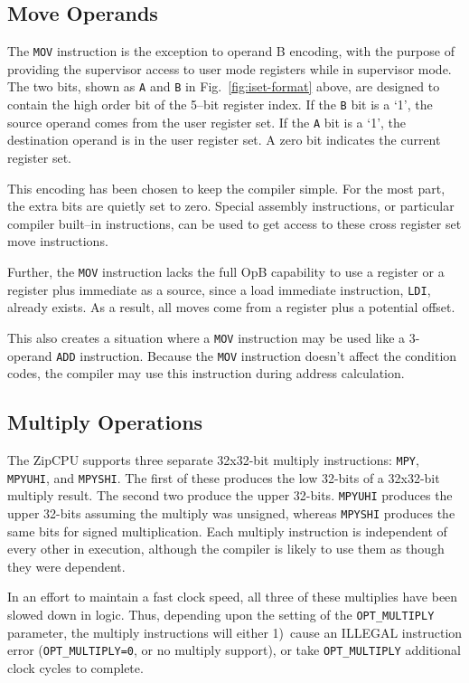 \documentclass{gqtekspec}
\begin{document}
\subsection{Move Operands}\label{sec:isa-mov}
The {\tt MOV} instruction is the exception to operand B encoding, with the
purpose of providing the supervisor access to user mode registers while in
supervisor mode.  The two bits, shown as {\tt A} and {\tt B} in
Fig.~\ref{fig:iset-format} above, are designed to contain the high order bit
of the 5--bit register index.  If the {\tt B} bit is a `1', the source operand
comes from the user register set.  If the {\tt A} bit is a `1', the
destination operand is in the user register set.  A zero bit indicates the
current register set.

This encoding has been chosen to keep the compiler simple.  For the most part,
the extra bits are quietly set to zero.  Special assembly instructions,
or particular compiler built--in instructions, can be used to get access to
these cross register set move instructions.

Further, the {\tt MOV} instruction lacks the full OpB capability to use a
register or a register plus immediate as a source, since a load immediate
instruction, {\tt LDI}, already exists.  As a result, all moves come from a
register plus a potential offset.

This also creates a situation where a {\tt MOV} instruction may be used
like a 3-operand {\tt ADD} instruction.  Because the {\tt MOV} instruction
doesn't affect the condition codes, the compiler may use this instruction
during address calculation.
\subsection{Multiply Operations}\label{sec:isa-mpy}
The ZipCPU supports three separate 32x32-bit multiply instructions: {\tt MPY},
{\tt MPYUHI}, and {\tt MPYSHI}.  The first of these produces the low 32-bits
of a 32x32-bit multiply result.  The second two produce the upper 32-bits.
{\tt MPYUHI} produces the upper 32-bits assuming the multiply was unsigned,
whereas {\tt MPYSHI} produces the same bits for signed multiplication.  Each
multiply instruction is independent of every other in execution, although
the compiler is likely to use them as though they were dependent.

In an effort to maintain a fast clock speed, all three of these multiplies
have been slowed down in logic.  Thus, depending upon the setting of
the {\tt OPT\_MULTIPLY} parameter, the multiply instructions
will either 1)~cause an ILLEGAL instruction error ({\tt OPT\_MULTIPLY=0}, or
no multiply support), or take {\tt OPT\_MULTIPLY} additional clock
cycles to complete.
\end{document}
